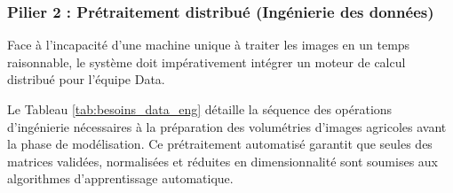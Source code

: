 

\subsubsection{Pilier 2 : Prétraitement distribué (Ingénierie des données)}
Face à l'incapacité d'une machine unique à traiter les images en un temps raisonnable, le système doit impérativement intégrer un moteur de calcul distribué pour l'équipe Data.

Le Tableau \ref{tab:besoins_data_eng} détaille la séquence des opérations d'ingénierie nécessaires à la préparation des volumétries d'images agricoles avant la phase de modélisation. Ce prétraitement automatisé garantit que seules des matrices validées, normalisées et réduites en dimensionnalité sont soumises aux algorithmes d'apprentissage automatique.

